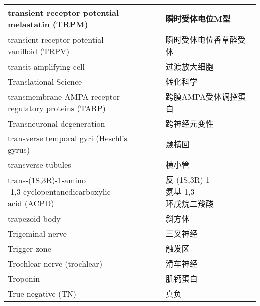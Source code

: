 \begin{longtable}{lll}
	\midrule
	\makecell[l]{transient receptor potential \\melastatin (TRPM)}   && 瞬时受体电位M型  \\
	
	\midrule
	\makecell[l]{transient receptor potential \\vanilloid (TRPV)}   && 瞬时受体电位香草醛受体  \\
	
	\midrule
	transit amplifying cell   && 过渡放大细胞  \\
	
	\midrule
	Translational Science   && 转化科学  \\
	
	\midrule
	\makecell[l]{transmembrane AMPA receptor\\ regulatory proteins (TARP)}  && 跨膜AMPA受体调控蛋白  \\
	
	\midrule
	Transneuronal degeneration  && 跨神经元变性  \\
	
	\midrule
	transverse temporal gyri (Heschl's gyrus)   && 颞横回  \\
	
	\midrule
	transverse tubules   && 横小管  \\
	
	\midrule
	\makecell[l]{trans-(1S,3R)-1-amino\\-1,3-cyclopentanedicarboxylic \\acid (ACPD)}  && \makecell[l]{反-(1S,3R)-1-\\氨基-1,3-\\环戊烷二羧酸}  \\
	
	\midrule
	trapezoid body   && 斜方体  \\
	
	\midrule
	Trigeminal nerve   && 三叉神经  \\
	
	\midrule
	Trigger zone   && 触发区  \\
	
	\midrule
	Trochlear nerve (trochlear)   && 滑车神经  \\
	
	\midrule
	Troponin   && 肌钙蛋白  \\
	
	\midrule
	True negative (TN) && 真负  \\
	

\end{longtable}
